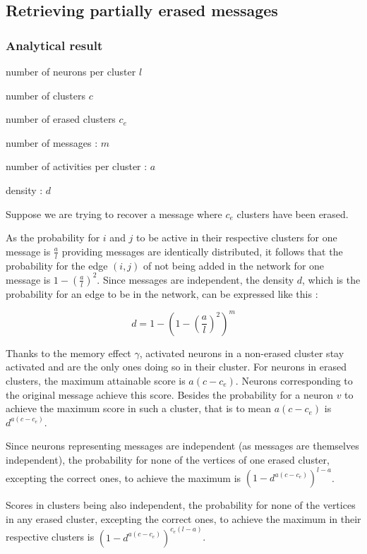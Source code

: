 \documentclass[english,11pt,twocolumn]{article}
\theoremstyle{definition}
\begin{document}
	\subsection{Retrieving partially erased messages}		
		
	\subsubsection{Analytical result}
		
	number of neurons per cluster $l$
	
	number of clusters $c$
	
	number of erased clusters $c_e$
	
	number of messages : $m$
	
	number of activities per cluster : $a$
	
	density : $d$
	
	Suppose we are trying to recover a message where $c_e$ clusters have been erased.
	
	As the probability for $i$ and $j$ to be active in their respective clusters for one message is $\frac{a}{l}$ providing messages are identically distributed, it follows that the probability for the edge $(i,j)$ of not being added in the network for one message is $1 - \left(\frac{a}{l}\right)^2$. Since messages are independent, the density $d$, which is the probability for an edge to be in the network, can be expressed like this :
	
			
	\[ d = 1 - \left( 1 - \left(\frac{a}{l}\right)^2 \right)^m \]
	
	Thanks to the memory effect $\gamma$, activated neurons in a non-erased cluster stay activated and are the only ones doing so in their cluster. For neurons in erased clusters, the maximum attainable score is $a(c - c_e)$. Neurons corresponding to the original message achieve this score. Besides the probability for a neuron $v$ to achieve the maximum score in such a cluster, that is to mean $a(c-c_e)$ is $d^{a(c-c_e)}$.
	
	
	Since neurons representing messages are independent (as messages are themselves independent), the probability for none of the vertices of one erased cluster, excepting the correct ones, to achieve the maximum is $\left(1 - d^	{a(c-c_e)}\right)^{l-a}$.
	
	Scores in clusters being also independent, the probability for none of the vertices in any erased cluster, excepting the correct ones, to achieve the maximum in their respective clusters is $\left(1 - d^	{a(c-c_e)}\right)^{c_e(l-a)}$.
	
\end{document}
